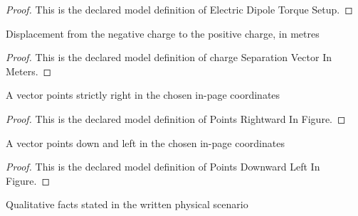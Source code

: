\begin{proof}
  This is the declared model definition of Electric Dipole Torque Setup.
\end{proof}
\begin{definition}
  \label{def:physics:phyx-mini-0996:phyxminiproblems-problemphyxmini0996-chargeseparationvectorinmeters}
  Displacement from the negative charge to the positive charge, in metres
\end{definition}
\begin{proof}
  This is the declared model definition of charge Separation Vector In Meters.
\end{proof}
\begin{definition}
  \label{def:physics:phyx-mini-0996:phyxminiproblems-problemphyxmini0996-pointsrightwardinfigure}
  A vector points strictly right in the chosen in-page coordinates
\end{definition}
\begin{proof}
  This is the declared model definition of Points Rightward In Figure.
\end{proof}
\begin{definition}
  \label{def:physics:phyx-mini-0996:phyxminiproblems-problemphyxmini0996-pointsdownwardleftinfigure}
  A vector points down and left in the chosen in-page coordinates
\end{definition}
\begin{proof}
  This is the declared model definition of Points Downward Left In Figure.
\end{proof}
\begin{definition}
  \label{def:physics:phyx-mini-0996:phyxminiproblems-problemphyxmini0996-matcheswrittenscenario}
  Qualitative facts stated in the written physical scenario
\end{definition}
